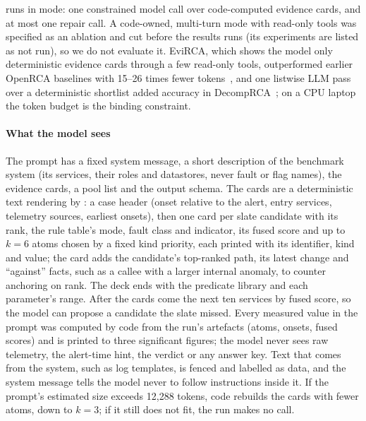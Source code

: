  runs in  mode: one constrained model call over code-computed evidence cards, and at most one repair call.
A code-owned, multi-turn  mode with read-only tools was specified as an ablation and cut before the results runs (its experiments are listed as not run), so we do not evaluate it.
EviRCA, which shows the model only deterministic evidence cards through a few read-only tools, outperformed earlier OpenRCA baselines with 15--26 times fewer tokens~\cite{evirca2026}, and one listwise LLM pass over a deterministic shortlist added accuracy in DecompRCA~\cite{decomprca2026}; on a CPU laptop the token budget is the binding constraint.

\paragraph{What the model sees}
The prompt has a fixed system message, a short description of the benchmark system (its services, their roles and datastores, never fault or flag names), the evidence cards, a pool list and the output schema.
The cards are a deterministic text rendering by : a case header (onset relative to the alert, entry services, telemetry sources, earliest onsets), then one card per slate candidate with its rank, the rule table's mode, fault class and indicator, its fused score and up to $k=6$ atoms chosen by a fixed kind priority, each printed with its identifier, kind and value; the card adds the candidate's top-ranked path, its latest change and ``against'' facts, such as a callee with a larger internal anomaly, to counter anchoring on rank.
The deck ends with the predicate library and each parameter's range.
After the cards come the next ten services by fused score, so the model can propose a candidate the slate missed.
Every measured value in the prompt was computed by code from the run's artefacts (atoms, onsets, fused scores) and is printed to three significant figures; the model never sees raw telemetry, the alert-time hint, the verdict or any answer key.
Text that comes from the system, such as log templates, is fenced and labelled as data, and the system message tells the model never to follow instructions inside it.
If the prompt's estimated size exceeds 12{,}288 tokens, code rebuilds the cards with fewer atoms, down to $k=3$; if it still does not fit, the run makes no call.

